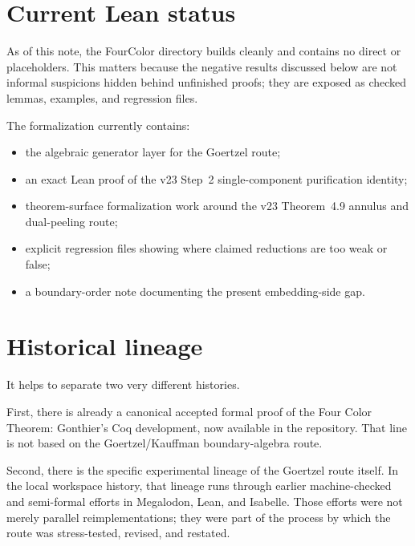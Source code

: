 \documentclass[11pt]{article}
\begin{document}
\section{Current Lean status}

As of this note, the FourColor directory builds cleanly and contains no direct
 or  placeholders.  This matters because the negative
results discussed below are not informal suspicions hidden behind unfinished
proofs; they are exposed as checked lemmas, examples, and regression files.

The formalization currently contains:
\begin{itemize}[leftmargin=2em]
\item the algebraic generator layer for the Goertzel route;
\item an exact Lean proof of the v23 Step~2 single-component purification
identity;
\item theorem-surface formalization work around the v23 Theorem~4.9 annulus and
dual-peeling route;
\item explicit regression files showing where claimed reductions are too weak or
false;
\item a boundary-order note documenting the present embedding-side gap.
\end{itemize}

\section{Historical lineage}

It helps to separate two very different histories.

First, there is already a canonical accepted formal proof of the Four Color
Theorem: Gonthier's Coq development, now available in the
 repository.  That line is not based on the
Goertzel/Kauffman boundary-algebra route.

Second, there is the specific experimental lineage of the Goertzel route
itself.  In the local workspace history, that lineage runs through earlier
machine-checked and semi-formal efforts in Megalodon, Lean, and Isabelle.
Those efforts were not merely parallel reimplementations; they were part of the
process by which the route was stress-tested, revised, and restated.
\end{document}
